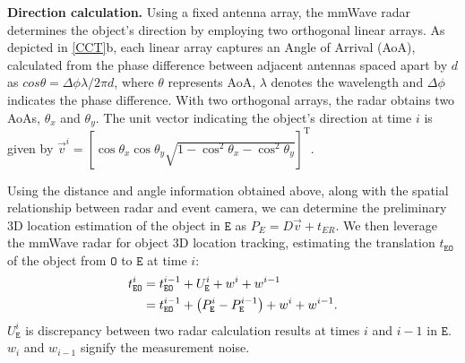 \textbf{Direction calculation.}
Using a fixed antenna array, the mmWave radar determines the object's direction by employing two orthogonal linear arrays. 
As depicted in \fig \ref{CCT}b, each linear array captures an Angle of Arrival (AoA), calculated from the phase difference between adjacent antennas spaced apart by $d$ as $cos \theta = \Delta \phi \lambda/2 \pi d$, where $\theta$ represents AoA, $\lambda$ denotes the wavelength and $\Delta \phi$ indicates the phase difference. 
With two orthogonal arrays, the radar obtains two AoAs, $\theta_x$ and $\theta_y$. The unit vector indicating the object's direction at time $i$ is given by
$\vec{v}^i=[\cos \theta_x \cos \theta_y \sqrt{1-\cos ^2 \theta_x-\cos ^2 \theta_y}]^{\mathrm{T}}$.

Using the distance and angle information obtained above, along with the spatial relationship between radar and event camera, we can determine the preliminary 3D location estimation of the object in $\mathtt{E}$ as $P_E = D\vec{v}+t_{ER}$.
We then leverage the mmWave radar for object 3D location tracking, estimating the translation $t_{\mathtt{EO}}$ of the object from $\mathtt{O}$ to $\mathtt{E}$ at time $i$:
\begin{equation}
\begin{aligned}
\vspace{-0.2cm}
t_{\mathtt{EO}}^i & =t_{\mathtt{EO}}^{i-1}+U_{\mathtt{E}}^{i}+w^i + w^{i-1} \\
& =t_{\mathtt{EO}}^{i-1}+\left(P_{\mathtt{E}}^i-P_{\mathtt{E}}^{i-1}\right)+w^i + w^{i-1}.
\vspace{-0.2cm}
\end{aligned}
\end{equation}
$U_{\mathtt{E}}^{i}$ is discrepancy between two radar calculation results at times $i$ and ${i-1}$ in $\mathtt{E}$. $w_i$ and $w_{i-1}$ signify the measurement noise.

